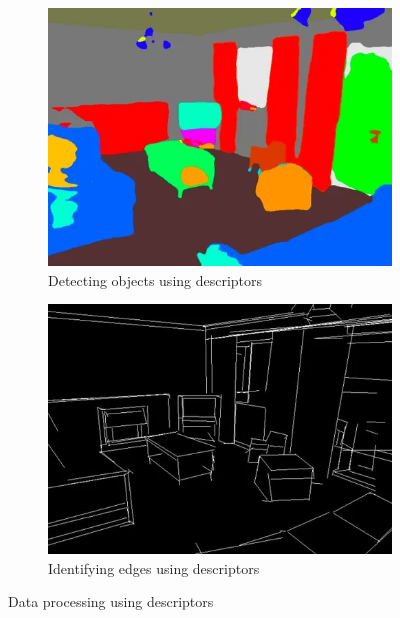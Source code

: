 \begin{figure}[htbp]
    \centering
    \begin{subfigure}[b]{0.38\textwidth}
        \centering
        \includegraphics[width=\textwidth]{images/objdet.png}
        \caption{Detecting objects using descriptors}
        \label{fig:desc_objdet}
    \end{subfigure}
    \hfill
    \begin{subfigure}[b]{0.38\textwidth}
        \centering
        \includegraphics[width=\textwidth]{images/edgedet.png}
        \caption{Identifying edges using descriptors}
        \label{fig:desc_edge}
    \end{subfigure}
    \caption{Data processing using descriptors}
    \label{fig:desc_data}
\end{figure}

